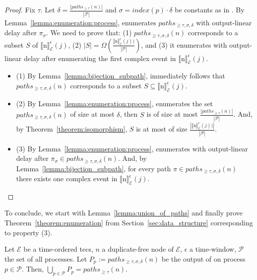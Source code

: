 \begin{proof}
  Fix $\tau$. Let $\delta = \frac{|paths_{\ge \tau}(n)|}{|\mathcal{P}|}$ and $\sigma = index(p) \cdot \delta$ be constants as in . By Lemma~\ref{lemma:enumeration:process},  enumerates $paths_{\ge \tau, \sigma, \delta}$ with output-linear delay after $\pi_{\sigma}$. We need to prove that: (1) $paths_{\ge \tau, \sigma, \delta}(n)$ corresponds to a subset $S$ of ${\llbracket \text{n} \rrbracket}^{\epsilon}_{\mathcal{E}}(j)$, (2) $|S| = \Omega(\frac{{\llbracket \text{n} \rrbracket}^{\epsilon}_{\mathcal{E}}(j))}{|\mathcal{P}|})$, and (3) it enumerates with output-linear delay after enumerating the first complex event in ${\llbracket \text{n} \rrbracket}^{\epsilon}_{\mathcal{E}}(j)$.

 \begin{itemize}
   \item (1) By Lemma~\ref{lemma:bijection_subpath}, immediately follows that $paths_{\ge \tau, \sigma, \delta}(n)$ corresponds to a subset $S \subseteq {\llbracket \text{n} \rrbracket}^{\epsilon}_{\mathcal{E}}(j)$.

   \item (2) By Lemma~\ref{lemma:enumeration:process},  enumerates the set $paths_{\ge \tau, \sigma, \delta}(n)$ of size at most $\delta$, then $S$ is of size at most $\frac{|paths_{\ge \tau}(n)|}{|\mathcal{P}|}$. And, by Theorem~\ref{theorem:isomorphism}, $S$ is at most of size $\frac{|{\llbracket \text{n} \rrbracket}^{\epsilon}_{\mathcal{E}}(j))|}{|\mathcal{P}|}$.

  \item (3) By Lemma~\ref{lemma:enumeration:process},  enumerates with output-linear delay after $\pi_{\sigma} \in paths_{\ge \tau, \sigma, \delta}(n)$. And, by Lemma~\ref{lemma:bijection_subpath}, for every path $\pi \in paths_{\ge \tau, \sigma, \delta}(n)$ there exists one complex event in ${\llbracket \text{n} \rrbracket}^{\epsilon}_{\mathcal{E}}(j)$.
 \end{itemize}

\end{proof}

To conclude, we start with Lemma~\ref{lemma:union_of_paths} and finally prove Theorem~\ref{theorem:enumeration} from Section~\ref{sec:data_structure} corresponding to property (3).

\begin{lemma}\label{lemma:union_of_paths}
  Let $\mathcal{E}$ be a time-ordered \acrshort{tecs}, $n$ a duplicate-free node of $\mathcal{E}$, $\epsilon$ a time-window, $\mathcal{P}$ the set of all processes. Let $P_{p} := paths_{\ge \tau, \sigma, \delta}(n)$ be the output of  on process $p \in \mathcal{P}$. Then, $\bigcup\limits_{p \in \mathcal{P}} P_{p} = paths_{\ge \tau}(n)$.
\end{lemma}

